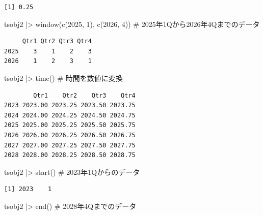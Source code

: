 \documentclass[
  letterpaper,
  DIV=11,
  numbers=noendperiod]{scrreprt}
\newenvironment{Shaded}{\begin{snugshade}}{\end{snugshade}}
\newcommand{\CommentTok}[1]{\textcolor[rgb]{0.37,0.37,0.37}{#1}}
\newcommand{\DecValTok}[1]{\textcolor[rgb]{0.68,0.00,0.00}{#1}}
\newcommand{\FunctionTok}[1]{\textcolor[rgb]{0.28,0.35,0.67}{#1}}
\newcommand{\NormalTok}[1]{\textcolor[rgb]{0.00,0.23,0.31}{#1}}
\newcommand{\SpecialCharTok}[1]{\textcolor[rgb]{0.37,0.37,0.37}{#1}}
\begin{document}
\begin{verbatim}
[1] 0.25
\end{verbatim}

\begin{Shaded}
\begin{Highlighting}[]
\NormalTok{tsobj2 }\SpecialCharTok{|\textgreater{}} \FunctionTok{window}\NormalTok{(}\FunctionTok{c}\NormalTok{(}\DecValTok{2025}\NormalTok{, }\DecValTok{1}\NormalTok{), }\FunctionTok{c}\NormalTok{(}\DecValTok{2026}\NormalTok{, }\DecValTok{4}\NormalTok{)) }\CommentTok{\# 2025年1Qから2026年4Qまでのデータ}
\end{Highlighting}
\end{Shaded}

\begin{verbatim}
     Qtr1 Qtr2 Qtr3 Qtr4
2025    3    1    2    3
2026    1    2    3    1
\end{verbatim}

\begin{Shaded}
\begin{Highlighting}[]
\NormalTok{tsobj2 }\SpecialCharTok{|\textgreater{}} \FunctionTok{time}\NormalTok{() }\CommentTok{\# 時間を数値に変換}
\end{Highlighting}
\end{Shaded}

\begin{verbatim}
        Qtr1    Qtr2    Qtr3    Qtr4
2023 2023.00 2023.25 2023.50 2023.75
2024 2024.00 2024.25 2024.50 2024.75
2025 2025.00 2025.25 2025.50 2025.75
2026 2026.00 2026.25 2026.50 2026.75
2027 2027.00 2027.25 2027.50 2027.75
2028 2028.00 2028.25 2028.50 2028.75
\end{verbatim}

\begin{Shaded}
\begin{Highlighting}[]
\NormalTok{tsobj2 }\SpecialCharTok{|\textgreater{}} \FunctionTok{start}\NormalTok{() }\CommentTok{\# 2023年1Qからのデータ}
\end{Highlighting}
\end{Shaded}

\begin{verbatim}
[1] 2023    1
\end{verbatim}

\begin{Shaded}
\begin{Highlighting}[]
\NormalTok{tsobj2 }\SpecialCharTok{|\textgreater{}} \FunctionTok{end}\NormalTok{() }\CommentTok{\# 2028年4Qまでのデータ}
\end{Highlighting}
\end{Shaded}
\end{document}
